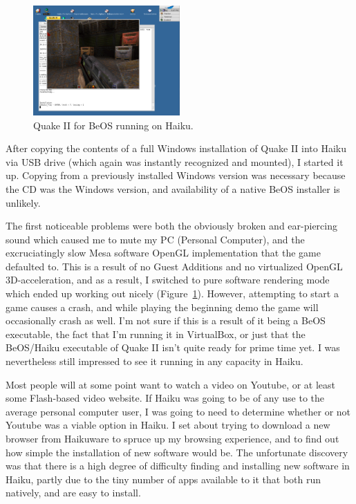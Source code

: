 \documentclass{article}
\newcommand{\figref}[1]{Figure~\ref{fig:#1}}
\begin{document}
\begin{figure}[h]
\centering
\includegraphics[width=0.5\textwidth]{figs/using-quake-play.png}
\caption{Quake II for BeOS running on Haiku.}
\label{fig:using-quake-play}
\end{figure}
	
After copying the contents of a full Windows installation of Quake II
into Haiku via USB drive (which again was instantly recognized and
mounted), I started it up. Copying from a previously installed Windows
version was necessary because the CD was the Windows version, and
availability of a native BeOS installer is unlikely.

The first noticeable problems were both the obviously broken and
ear-piercing sound which caused me to mute my PC (Personal Computer),
and the excruciatingly slow Mesa software OpenGL implementation that
the game defaulted to.  This is a result of no Guest Additions and no
virtualized OpenGL 3D-acceleration, and as a result, I switched to
pure software rendering mode which ended up working out nicely
(\figref{using-quake-play}).  However, attempting to start a game
causes a crash, and while playing the beginning demo the game will
occasionally crash as well.  I'm not sure if this is a result of it
being a BeOS executable, the fact that I'm running it in VirtualBox,
or just that the BeOS/Haiku executable of Quake II isn't quite ready
for prime time yet.  I was nevertheless still impressed to see it
running in any capacity in Haiku.
	
Most people will at some point want to watch a video on Youtube, or at
least some Flash-based video website.  If Haiku was going to be of any
use to the average personal computer user, I was going to need to
determine whether or not Youtube was a viable option in Haiku.  I set
about trying to download a new browser from Haikuware to spruce up my
browsing experience, and to find out how simple the installation of
new software would be. The unfortunate discovery was that there is a
high degree of difficulty finding and installing new software in
Haiku, partly due to the tiny number of apps available to it that both
run natively, and are easy to install.
\end{document}
